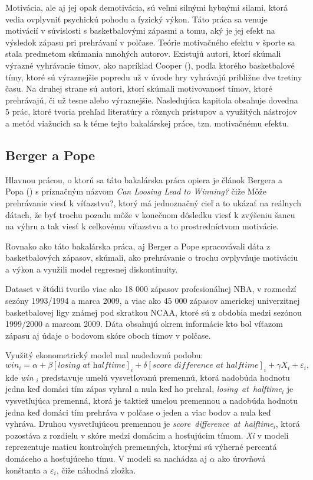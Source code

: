 \documentclass[
  digital, %
  oneside, %
  notable,   %
  lof,     %
  lot,     %
]{fithesis3}
\begin{document}
		Motivácia, ale aj jej opak demotivácia, sú veľmi silnými hybnými silami, ktorá vedia ovplyvniť psychickú pohodu a fyzický výkon. Táto práca sa venuje motivácií v súvislosti s basketbalovými zápasmi a tomu, aký je jej efekt na výsledok zápasu pri prehrávaní v polčase. Teórie motivačného efektu v športe sa stala predmetom skúmania mnohých autorov. Existujú autori, ktorí skúmali výrazné vyhrávanie tímov, ako napríklad Cooper (\citeyear{cooper1992}), podľa ktorého basketbalové tímy, ktoré sú výraznejšie popredu už v úvode hry vyhrávajú približne dve tretiny času. Na druhej strane sú autori, ktorí skúmali motivovanosť tímov, ktoré prehrávajú, či už tesne alebo výraznejšie. Nasledujúca kapitola obsahuje dovedna 5 prác, ktoré tvoria prehľad literatúry a rôznych prístupov a využitých nástrojov a metód viažucich sa k téme tejto bakalárskej práce, tzn. motivačnému efektu.
		
		\subsection{Berger a Pope}
		\label{sec:Berger}
		Hlavnou prácou, o ktorú sa táto bakalárska práca opiera je článok Bergera a Popa (\citeyear{berger2011}) s príznačným názvom \textit{Can Loosing Lead to Winning?} čiže Môže prehrávanie viesť k víťazstvu?, ktorý má jednoznačný cieľ a to ukázať na reálnych dátach, že byť trochu pozadu môže v konečnom dôsledku viesť k zvýšeniu šancu na výhru a tak viesť k celkovému víťazstvu a to prostredníctvom motivácie.
		
		Rovnako ako táto bakalárska práca, aj Berger a Pope spracovávali dáta z basketbalových zápasov, skúmali, ako prehrávanie o trochu ovplyvňuje motiváciu a výkon a využili model regresnej diskontinuity. 
		
		Dataset v štúdii tvorilo viac ako 18 000 zápasov profesionálnej NBA, v rozmedzí sezóny 1993/1994 a marca 2009, a viac ako 45 000 zápasov americkej univerzitnej basketbalovej ligy známej pod skratkou NCAA, ktoré sú z obdobia medzi sezónou 1999/2000 a marcom 2009. \parencite[s.~818]{berger2011} Dáta obsahujú okrem informácie kto bol víťazom zápasu aj údaje o bodovom skóre oboch tímov v polčase.
		
		Využitý ekonometrický model mal nasledovnú podobu:
		\begin{equation}
		win_{i} = \alpha + \beta [\textit{losing~at~halftime}]_{i} + \delta [\textit{score~difference~at~halftime}]_{i} + \gamma X_{i} + \varepsilon_{i},
		\end{equation}
		kde \textit{ win $ _{i} $} predstavuje umelú vysvetľovanú premennú, ktorá nadobúda hodnotu jedna keď domáci tím zápas vyhral a nula keď ho prehral, \textit{losing~at~halftime$ _{i} $} je vysvetľujúca premenná, ktorá je taktiež umelou premennou a nadobúda hodnotu jedna keď domáci tím prehráva v polčase o jeden a viac bodov a nula keď vyhráva. Druhou vysvetľujúcou premennou je \textit{score~difference~at~halftime$ _{i} $}, ktorá pozostáva z rozdielu v skóre medzi domácim a hosťujúcim tímom. \textit{Xi} v modeli reprezentuje maticu kontrolných premenných, ktorými sú výherné percentá domáceho a hosťujúceho tímu.  V modeli sa nachádza aj $\alpha$ ako úrovňová konštanta a $\varepsilon_{i}$, čiže náhodná zložka.
		
\end{document}
